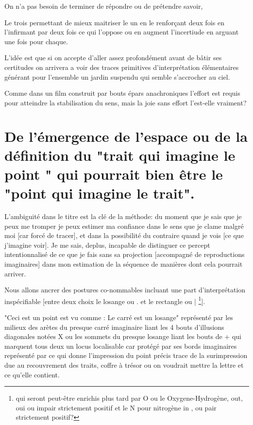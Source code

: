 \documentclass{article}
\begin{document}
 On n'a pas besoin de terminer de répondre ou de prétendre savoir, 
 
 Le trois permettant de mieux maitriser le un en le renforçant deux fois en l'infirmant par deux fois ce qui l'oppose ou en augment l'incertiude en arguant une fois pour chaque.

L'idée est que si on accepte d'aller assez profondément avant de bâtir ses certitudes on arrivera a voir des traces primitives d'interprétation élémentaires 
générant pour l'ensemble un jardin suspendu qui semble s'accrocher au ciel.
 
 Comme dans un film construit par bouts épars anachroniques l'effort est requis pour atteindre la stabilisation du sens, mais la joie sans effort l'est-elle vraiment?
  
\section{De l'émergence de l'espace ou de la définition du "trait qui imagine le point " qui pourrait bien être le "point qui imagine le trait".   }
L'ambiguité dans le titre est la clé de la méthode: du moment que je sais que je peux me tromper je peux estimer ma confiance dans le sens que je clame malgré moi [car forcé de tracer], et dans la possibilité du contraire quand je vois [ce que j'imagine voir]. Je me sais, deplus, incapable de distinguer ce percept intentionnalisé de ce que je fais sans sa projection [accompagné de reproductions imaginaires] dans  mon estimation de la séquence de manières dont cela pourrait arriver.


 
Nous allons 
ancrer des postures co-nommables  incluant une part d'interprétation inspécifiable [entre  deux choix le losange ou .  et le rectangle ou | \footnote{qui seront peut-être enrichis plus tard par  O ou le Oxygene-Hydrogène, out, oui ou impair strictement positif et le N pour nitrogène in , ou pair strictement positif?}].

"Ceci est un point est vu comme : Le carré est un losange" représenté par  les milieux des arètes du presque carré imaginaire liant les 4 bouts d'illusions diagonales notées X ou les sommets du presque losange liant les bouts de + qui marquent tous deux un locus localisable car protégé par ses bords imaginaires représenté par ce qui donne l'impression du point précis trace de la surimpression due  au recouvrement des traits,  coffre à trésor ou on voudrait mettre la lettre et ce qu'elle contient.
 
\end{document}
